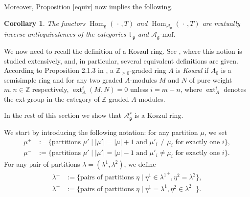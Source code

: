 \documentclass{amsart}
\newcommand{\Tg}{\mathbb T_{\mathfrak g}}
\renewcommand{\gg}{\mathfrak{g}}
\newtheorem{cor}[thm]{Corollary}
\theoremstyle{definition}
\numberwithin{equation}{section}
\begin{document}
Moreover, Proposition \ref{equiv} now implies the following.

\begin{cor}\label{bigequiv} 
The functors
  $\operatorname{Hom}_\gg(\, \cdot \,, T)$ and
  $\operatorname{Hom}_{\mathcal A_\gg}(\, \cdot \,, T)$ are mutually inverse
  antiequivalences of the categories  $\Tg$ and
  $\mathcal{A}_\gg$-$\mathrm{mof}$.
\end{cor}


We now need to recall the definition of a Koszul ring. See
\cite{BGS}, where this notion is studied extensively, and, in
particular, several equivalent definitions are given. According to
 Proposition 2.1.3 in \cite{BGS}, a $\mathbb Z_{\geq 0}$-graded ring $A$
is \emph{Koszul} if $A_0$ is a semisimple ring and for any two graded $A$-modules
$M$ and $N$  of pure weight $m, n \in \mathbb{Z}$ respectively,
$\operatorname{ext}_A^i(M,N)=0$ unless $i=m-n$, where
$\operatorname{ext}_A^i$ denotes the ext-group in the category of
$\mathbb{Z}$-graded $A$-modules. 

In the rest of this section we show that 
$\mathcal A^r_\gg$ is a Koszul ring. 

We start by introducing the following notation: for any partition $\mu$, we set
\begin{align*}
\mu^+ & := \{ \textrm{partitions } \mu' \mid |\mu'| = |\mu| + 1 \textrm{ and } \mu'_i \neq \mu_i \textrm{ for exactly one }i \}, \\
\mu^- & := \{  \textrm{partitions } \mu' \mid |\mu'| = |\mu| - 1 \textrm{ and } \mu'_i \neq \mu_i \textrm{ for exactly one }i \}.
\end{align*} 
For any pair of partitions $\lambda = (\lambda^1,\lambda^2)$, we define
\begin{align*}
\lambda^+ & := \{ \textrm{pairs of partitions } \eta \mid \eta^1\in{\lambda^1}^+, \eta^2=\lambda^2
 \}, \\
\lambda^- & := \{  \textrm{pairs of partitions } \eta \mid \eta^1=\lambda^1, \eta^2\in{\lambda^2}^-  \}.
\end{align*} 
\end{document}
